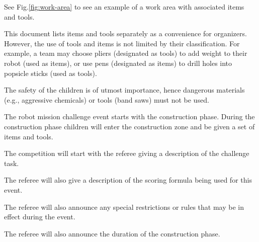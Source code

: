 \documentclass[12pt]{hurocup}
\begin{document}
\begin{decisions}
  See Fig.\ref{fig:work-area} to see an example of a work area with
  associated items and tools.

\item This document lists items and tools separately as a convenience
  for organizers. However, the use of tools and items is not limited
  by their classification. For example, a team may choose pliers
  (designated as tools) to add weight to their robot (used as items),
  or use pens (designated as items) to drill holes into popsicle
  sticks (used as tools).

\item The safety of the children is of utmost importance, hence
  dangerous materials (e.g., aggressive chemicals) or tools (band
  saws) must not be used.

\end{decisions}

\label{law-game-play}

\begin{lawlist}[JC]

\item The robot mission challenge event starts with the construction
  phase. During the construction phase children will enter the
  construction zone and be given a set of items and tools.

\item \label{g-task} The competition will start with the referee
  giving a description of the challenge task.

\item \label{g-score} The referee will also give a description of the
  scoring formula being used for this event.

\item \label{g-rule} The referee will also announce any special
  restrictions or rules that may be in effect during the event.

\item \label{g-duration} The referee will also announce the duration
  of the construction phase.

\end{lawlist}
\end{document}
